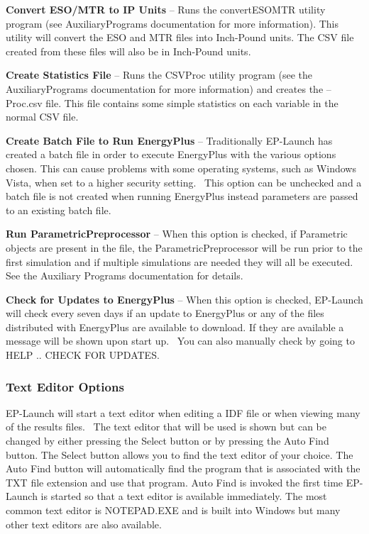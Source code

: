 \textbf{Convert ESO/MTR to IP Units} -- Runs the convertESOMTR utility program (see AuxiliaryPrograms documentation for more information). This utility will convert the ESO and MTR files into Inch-Pound units. The CSV file created from these files will also be in Inch-Pound units.

\textbf{Create Statistics File} -- Runs the CSVProc utility program (see the AuxiliaryPrograms documentation for more information) and creates the --Proc.csv file. This file contains some simple statistics on each variable in the normal CSV file.

\textbf{Create Batch File to Run EnergyPlus} -- Traditionally EP-Launch has created a batch file in order to execute EnergyPlus with the various options chosen. This can cause problems with some operating systems, such as Windows Vista, when set to a higher security setting.~ This option can be unchecked and a batch file is not created when running EnergyPlus instead parameters are passed to an existing batch file.

\textbf{Run ParametricPreprocessor} -- When this option is checked, if Parametric objects are present in the file, the ParametricPreprocessor will be run prior to the first simulation and if multiple simulations are needed they will all be executed. See the Auxiliary Programs documentation for details.

\textbf{Check for Updates to EnergyPlus} -- When this option is checked, EP-Launch will check every seven days if an update to EnergyPlus or any of the files distributed with EnergyPlus are available to download. If they are available a message will be shown upon start up.~ You can also manually check by going to HELP .. CHECK FOR UPDATES.

\subsubsection{Text Editor Options}\label{text-editor-options}

EP-Launch will start a text editor when editing a IDF file or when viewing many of the results files.~ The text editor that will be used is shown but can be changed by either pressing the Select button or by pressing the Auto Find button. The Select button allows you to find the text editor of your choice. The Auto Find button will automatically find the program that is associated with the TXT file extension and use that program. Auto Find is invoked the first time EP-Launch is started so that a text editor is available immediately. The most common text editor is NOTEPAD.EXE and is built into Windows but many other text editors are also available.

